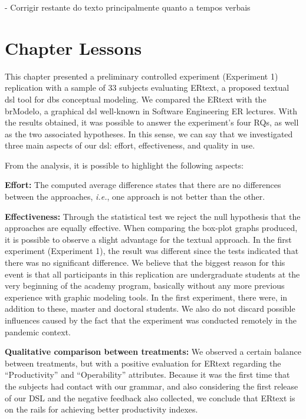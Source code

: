 - Corrigir restante do texto principalmente quanto a tempos verbais

\cleardoublepage
\section{Chapter Lessons}
\label{sec_experiments:lessons}

This chapter presented a preliminary controlled experiment (Experiment 1) replication with a sample of 33 subjects evaluating ERtext, a proposed textual \ac{dsl} tool for \acp{db} conceptual modeling. 
We compared the ERtext with the brModelo, a graphical \ac{dsl} well-known in Software Engineering ER lectures. 
With the results obtained, it was possible to answer the experiment's four RQs, as well as the two associated hypotheses.
In this sense, we can say that we investigated three main aspects of our \ac{dsl}: effort, effectiveness, and quality in use.

From the analysis, it is possible to highlight the following aspects:

\item \textbf{Effort:} The computed average difference states that there are no differences between the approaches, \textit{i.e.}, one approach is not better than the other. 

\item \textbf{Effectiveness:} Through the statistical test we reject the null hypothesis that the approaches are equally effective. 
When comparing the box-plot graphs produced, it is possible to observe a slight advantage for the textual approach. 
In the first experiment (Experiment 1), the result was different since the tests indicated that there was no significant difference. 
We believe that the biggest reason for this event is that all participants in this replication are undergraduate students at the very beginning of the academy program, basically without any more previous experience with graphic modeling tools. 
In the first experiment, there were, in addition to these, master and doctoral students. 
We also do not discard possible influences caused by the fact that the experiment was conducted remotely in the pandemic context.

\item \textbf{Qualitative comparison between treatments:} We observed a certain balance between treatments, but with a positive evaluation for ERtext regarding the ``Productivity'' and ``Operability'' attributes.
Because it was the first time that the subjects had contact with our grammar, and also considering the first release of our DSL and the negative feedback also collected, we conclude that ERtext is on the rails for achieving better productivity indexes.

